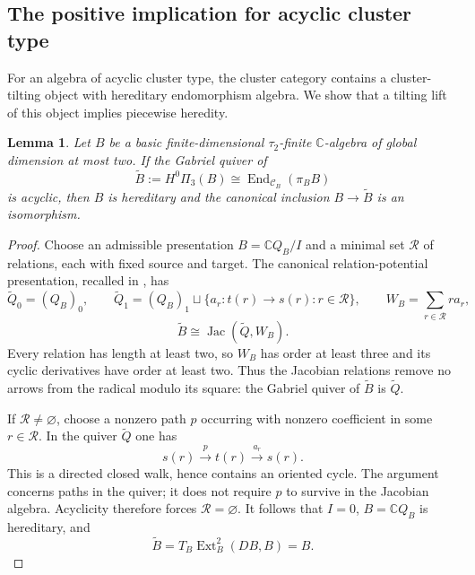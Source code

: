 \documentclass[12pt,a4paper,english,reqno]{amsart}
\theoremstyle{plain}
\newtheorem{lem}[thm]{Lemma}
\theoremstyle{definition}
\numberwithin{equation}{section}
\def\ta{\tau}
\def\End{\operatorname{End}}
\def\calC{{\mathcal C}}
\def\bbC{{\mathbb C}}
\def\iso{\cong}
\def\ya#1{\xrightarrow{#1}}
\def\Jac{\operatorname{Jac}}
\begin{document}
\subsection{The positive implication for acyclic cluster type}\label{subsec:acyclic-lifting}
For an algebra of acyclic cluster type, the cluster category contains a cluster-tilting object with hereditary endomorphism algebra. We show that a tilting lift of this object implies piecewise heredity.

\begin{lem}\label{lem:acyclic-canonical}
Let $B$ be a basic finite-dimensional $\ta_2$-finite $\bbC$-algebra of global dimension at most two. If the Gabriel quiver of
\[
 \widetilde B:=H^0\Pi_3(B)
       \iso\End_{\calC_B}(\pi_B B)
\]
is acyclic, then $B$ is hereditary and the canonical inclusion $B\to\widetilde B$ is an isomorphism.
\end{lem}
\begin{proof}
Choose an admissible presentation $B=\bbC Q_B/I$ and a minimal set $\mathcal R$ of relations, each with fixed source and target. The canonical relation-potential presentation, recalled in \cite[Theorem 2.5]{AOTree}, has
\[
 \widetilde Q_0=(Q_B)_0,\qquad
 \widetilde Q_1=(Q_B)_1\sqcup
       \{a_r:t(r)\longrightarrow s(r):r\in\mathcal R\},\qquad
 W_B=\sum_{r\in\mathcal R}r a_r,
\]
\[
 \widetilde B\iso\Jac(\widetilde Q,W_B).
\]
Every relation has length at least two, so $W_B$ has order at least three and its cyclic derivatives have order at least two. Thus the Jacobian relations remove no arrows from the radical modulo its square: the Gabriel quiver of $\widetilde B$ is $\widetilde Q$.

If $\mathcal R\ne\varnothing$, choose a nonzero path $p$ occurring with nonzero coefficient in some $r\in\mathcal R$. In the quiver $\widetilde Q$ one has
\[
 s(r)\ya{\ p\ }t(r)\ya{\ a_r\ }s(r).
\]
This is a directed closed walk, hence contains an oriented cycle. The argument concerns paths in the quiver; it does not require $p$ to survive in the Jacobian algebra. Acyclicity therefore forces $\mathcal R=\varnothing$. It follows that $I=0$, $B=\bbC Q_B$ is hereditary, and
\[
 \widetilde B=T_B\operatorname{Ext}^2_B(DB,B)=B.
\]
\end{proof}
\end{document}
